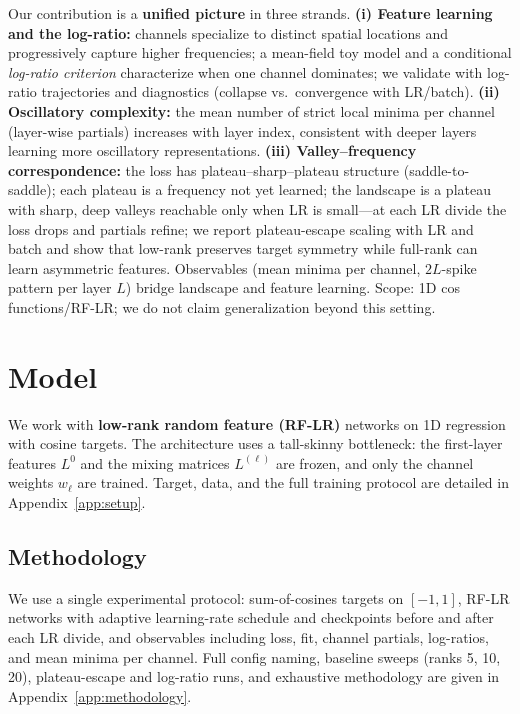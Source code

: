 \documentclass{article}
\theoremstyle{plain}
\theoremstyle{definition}
\begin{document}
Our contribution is a \textbf{unified picture} in three strands. \textbf{(i) Feature learning and the log-ratio:} channels specialize to distinct spatial locations and progressively capture higher frequencies; a mean-field toy model \cite{nguyen2023rigorousframeworkmeanfield,pham2021globalconvergencethreelayerneural} and a conditional \emph{log-ratio criterion} characterize when one channel dominates; we validate with log-ratio trajectories and diagnostics (collapse vs.\ convergence with LR/batch). \textbf{(ii) Oscillatory complexity:} the mean number of strict local minima per channel (layer-wise partials) increases with layer index, consistent with deeper layers learning more oscillatory representations. \textbf{(iii) Valley--frequency correspondence:} the loss has plateau--sharp--plateau structure (saddle-to-saddle); each plateau is a frequency not yet learned; the landscape is a plateau with sharp, deep valleys reachable only when LR is small---at each LR divide the loss drops and partials refine; we report plateau-escape scaling with LR and batch and show that low-rank preserves target symmetry while full-rank can learn asymmetric features. Observables (mean minima per channel, $2L$-spike pattern per layer $L$) bridge landscape and feature learning. Scope: 1D cos functions/RF-LR; we do not claim generalization beyond this setting.

\section{Model}
\label{sec:model}

We work with \textbf{low-rank random feature (RF-LR)} networks \cite{zhang2025structuredbalancedmulticomponentmultilayer} on 1D regression with cosine targets. The architecture uses a tall-skinny bottleneck: the first-layer features $L^0$ and the mixing matrices $L^{(\ell)}$ are frozen, and only the channel weights $w_\ell$ are trained. Target, data, and the full training protocol are detailed in Appendix~\ref{app:setup}.

\subsection{Methodology}
\label{sec:theory}

We use a single experimental protocol: sum-of-cosines targets on $[-1,1]$, RF-LR networks with adaptive learning-rate schedule and checkpoints before and after each LR divide, and observables including loss, fit, channel partials, log-ratios, and mean minima per channel. Full config naming, baseline sweeps (ranks 5, 10, 20), plateau-escape and log-ratio runs, and exhaustive methodology are given in Appendix~\ref{app:methodology}.
\end{document}
